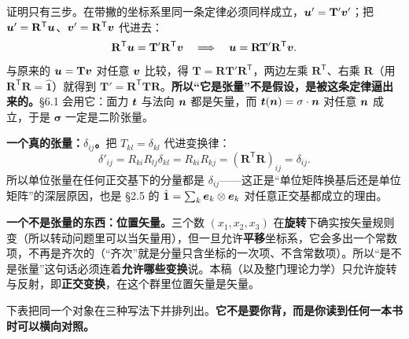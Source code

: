 \documentclass[11pt]{ctexart}
\newcommand{\ten}[1]{\mathbf{#1}}
\newcommand{\unitd}{\hat{\ten{1}}}
\let\origsubhdr\subhdr
\renewcommand{\subhdr}[1]{\par\needspace{3\baselineskip}\origsubhdr{#1}}
\begin{document}
证明只有三步。在带撇的坐标系里同一条定律必须同样成立，$\vect u'=\ten T'\vect v'$；把 $\vect u'=\ten R^{\mathsf T}\vect u$、$\vect v'=\ten R^{\mathsf T}\vect v$ 代进去：
\[
\ten R^{\mathsf T}\vect u=\ten T'\ten R^{\mathsf T}\vect v
\quad\Longrightarrow\quad
\vect u=\ten R\ten T'\ten R^{\mathsf T}\vect v .
\]
与原来的 $\vect u=\ten T\vect v$ 对任意 $\boldsymbol{v}$ 比较，得 $\ten T=\ten R\ten T'\ten R^{\mathsf T}$，两边左乘 $\ten R^{\mathsf T}$、右乘 $\ten R$（用 $\ten R^{\mathsf T}\ten R=\unitd$）就得到 $\ten T'=\ten R^{\mathsf T}\ten T\ten R$。\textbf{所以“它是张量”不是假设，是被这条定律逼出来的。}\S6.1 会用它：面力 $\boldsymbol{t}$ 与法向 $\boldsymbol{n}$ 都是矢量，而 $\vect t(\vect n)=\ten\sigma\cdot\vect n$ 对任意 $\boldsymbol{n}$ 成立，于是 $\ten\sigma$ 一定是二阶张量。

\textbf{一个真的张量：$\delta_{ij}$。}把 $T_{kl}=\delta_{kl}$ 代进变换律：
\[
\delta'_{ij}=R_{ki}R_{lj}\delta_{kl}=R_{ki}R_{kj}=(\ten R^{\mathsf T}\ten R)_{ij}=\delta_{ij}.
\]
所以单位张量在任何正交基下的分量都是 $\delta_{ij}$——这正是“单位矩阵换基后还是单位矩阵”的深层原因，也是 \S2.5 的 $\unitd=\sum_k\vect e_k\otimes\vect e_k$ 对任意正交基都成立的理由。

\textbf{一个不是张量的东西：位置矢量。}三个数 $(x_1,x_2,x_3)$ 在\textbf{旋转}下确实按矢量规则变（所以转动问题里可以当矢量用），但一旦允许\textbf{平移}坐标系，它会多出一个常数项，不再是齐次的（“齐次”就是分量只含坐标的一次项、不含常数项）。所以“是不是张量”这句话必须连着\textbf{允许哪些变换}说。本稿（以及整门理论力学）只允许旋转与反射，即\textbf{正交变换}，在这个群里位置矢量是矢量。

\label{subsec:dictionary}

下表把同一个对象在三种写法下并排列出。\textbf{它不是要你背，而是你读到任何一本书时可以横向对照。}
\end{document}
